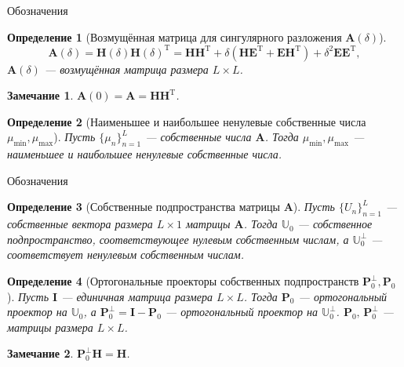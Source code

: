 \documentclass[notheorems, handout]{beamer}
\newtheorem{remark}{Замечание}
\newtheorem{definition}{Определение}
\begin{document}
	\begin{frame}{Обозначения}
		\begin{definition}[Возмущённая матрица для сингулярного разложения $\mathbf{A}(\delta)$]
			\begin{equation*}
				\mathbf{A}(\delta) = \mathbf{H}(\delta)\mathbf{H}(\delta)^\mathrm{T} = \mathbf{HH}^\mathrm{T} + \delta(\mathbf{HE}^\mathrm{T} + \mathbf{EH}^\mathrm{T}) + \delta^2\mathbf{EE}^\mathrm{T},
			\end{equation*}
			$\mathbf{A}(\delta)$ --- возмущённая матрица размера $L\times L$.
		\end{definition}
		\begin{remark}
			$\mathbf{A}(0)=\mathbf{A}=\mathbf{HH}^\mathrm{T}$.
		\end{remark}
		\begin{definition}[Наименьшее и наибольшее ненулевые собственные числа $\mu_{\min},\mu_{\max}$]
			Пусть $\{\mu_n\}_{n=1}^L$ --- собственные числа $\mathbf{A}$. Тогда $\mu_{\min}, \mu_{\max}$ --- наименьшее и наибольшее ненулевые собственные числа.
		\end{definition}
	\end{frame}
	\begin{frame}{Обозначения}
		\begin{definition}[Собственные подпространства матрицы $\mathbf{A}$]
			Пусть $\{U_n\}_{n=1}^L$ --- собственные вектора размера $L\times 1$ матрицы $\mathbf{A}$. Тогда $\mathbb{U}_0$ --- собственное подпространство, соответствующее нулевым собственным числам, а $\mathbb{U}_0^\bot$ --- соответствует ненулевым собственным числам.
		\end{definition}
		\begin{definition}[Ортогональные проекторы собственных подпространств $\mathbf{P}_0^\bot, \mathbf{P}_0$]
			Пусть $\mathbf{I}$ --- единичная матрица размера $L\times L$. Тогда $\mathbf{P}_0$ --- ортогональный проектор на $\mathbb{U}_0$, а $\mathbf{P}_0^\bot = \mathbf{I} - \mathbf{P}_0$ --- ортогональный проектор на $\mathbb{U}_0^\bot$. $\mathbf{P}_0,\,\mathbf{P}_0^\bot$ --- матрицы размера $L\times L$.
		\end{definition}
		\begin{remark}
			$\mathbf{P}_0^\bot\mathbf{H}=\mathbf{H}$.
		\end{remark}
	\end{frame}
\end{document}
